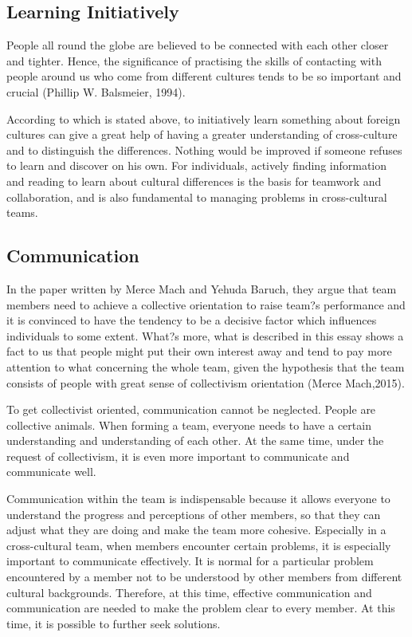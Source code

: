 \documentclass{article}
\begin{document}
\subsection{Learning Initiatively}

People all round the globe are believed to be connected with each other closer and tighter. Hence, the significance of practising the skills of contacting with people around us who come from different cultures tends to be so important and crucial (Phillip W. Balsmeier, 1994). \cite{balsmeier1994cross}

\noindent According to which is stated above, to initiatively learn something about foreign cultures can give a great help of having a 
greater understanding of cross-culture and to distinguish the differences. Nothing would be improved if someone refuses to learn and discover on his own. For individuals, actively finding information and reading to learn about cultural differences is the basis for teamwork and collaboration, and is also fundamental to managing problems in cross-cultural teams.

\subsection{Communication}

In the paper written by Merce Mach and Yehuda Baruch, they argue that team members need to achieve a collective orientation to raise team?s performance and it is convinced to have the tendency to be a decisive factor which influences individuals to some extent. What?s more, what is described in this essay shows a fact to us that people might put their own interest away and tend to pay more attention to what concerning the whole team, given the hypothesis that the team consists of people with great sense of collectivism orientation (Merce Mach,2015). \cite{mach2015team}

\noindent To get collectivist oriented, communication cannot be neglected. People are collective animals. When forming a team, everyone needs to have a certain understanding and understanding of each other. At the same time, under the request of collectivism, it is even more important to communicate and communicate well. 

\noindent Communication within the team is indispensable because it allows everyone to understand the progress and perceptions of other members, so that they can adjust what they are doing and make the team more cohesive. Especially in a cross-cultural team, when members encounter certain problems, it is especially important to communicate effectively. It is normal for a particular problem encountered by a member not to be understood by other members from different cultural backgrounds. Therefore, at this time, effective communication and communication are needed to make the problem clear to every member. At this time, it is possible to further seek solutions.
\end{document}

